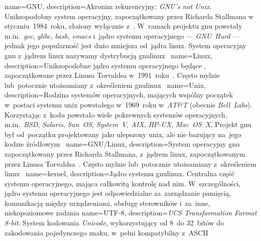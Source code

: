 


{
	name={GNU},
	description={Akronim rekurencyjny: \emph{GNU’s not Unix}. Uniksopodobny system operacyjny, zapoczątkowany przez Richarda Stallmana w styczniu~1984~roku, złożony wyłącznie z~. W~ramach projektu \gls{gnu} powstały m.in.~\emph{gcc}, \emph{glibc}, \emph{bash}, \emph{emacs} i~jądro systemu operacyjnego --- \emph{GNU~Hurd} --- jednak jego popularność jest dużo mniejsza od~jądra \gls{linux}. System operacyjny \gls{gnu} z~jądrem \gls{linux} nazywamy dystrybucją \gls{gnulinux}~\cite{gnu,gnulinux,gnu-faq,wiki:linux-naming-controversy}}
}
{
	name={Linux},
	description={Uniksopodobne jądro systemu operacyjnego będące , zapoczątkowane przez Linusa Torvaldsa w~1991~roku~\cite{linux-kernel}. Często mylnie lub~potocznie utożsamiany z~określeniem \gls{gnulinux}~\cite{gnu-faq,wiki:linux-naming-controversy}}
}
{
	name={Unix},
	description={Rodzina systemów operacyjnych, mających wspólny początek w~postaci systemu \gls{unix} powstałego w~1969~roku w~\emph{AT\&T} (obecnie \emph{Bell~Labs}). Korzystając z~kodu  powstało wiele pokrewnych systemów operacyjnych, m.in.~\emph{BSD}, \emph{Solaris}, \emph{Sun~OS}, \emph{System~V}, \emph{AIX}, \emph{HP-UX}, \emph{Mac~OS~X}. Projekt \gls{gnu} był od~początku projektowany jako ulepszony \gls{unix}, ale nie bazujący na~jego kodzie źródłowym~\cite{gnu-initial-msg}}
}
{
	name={GNU/Linux},
	description={System operacyjny \gls{gnu} zapoczątkowany przez Richarda Stallmana, z~jądrem \gls{linux}, zapoczątkowanym przez Linusa Torvaldsa~\cite{gnulinux}. Często mylnie lub~potocznie utożsamiany z~określeniem \gls{linux}~\cite{gnu-faq,wiki:linux-naming-controversy}}
}
{
	name={kernel},
	description={Jądro systemu \gls{gnulinux}. Centralna część systemu operacyjnego, mająca całkowitą kontrolę nad nim. W~szczególności, jądro systemu operacyjnego jest odpowiedzialne za~zarządzanie pamięcią, komunikacją między urządzeniami, obsługę sterowników i~za~inne, niskopoziomowe zadania}
}
{
	name={UTF-8},
	description={\emph{UCS Transformation Format 8-bit}. System kodowania \emph{Unicode}, wykorzystujący od 8~do 32~bitów do zakodowania pojedynczego znaku, w~pełni kompatybilny z~\gls{ASCII}}
}
